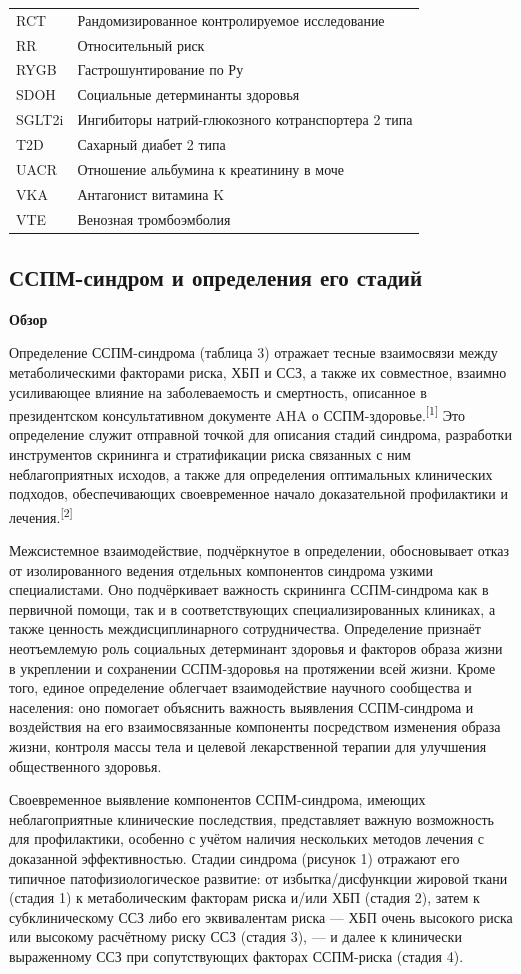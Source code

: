 \documentclass[11pt,a4paper]{article}
\newcommand{\src}[1]{\textsuperscript{[#1]}}
\newcommand{\heading}[1]{\par\medskip\textbf{#1}\par}
\begin{document}
{\begin{longtable}{P{0.18\textwidth}P{0.75\textwidth}}
RCT & Рандомизированное контролируемое исследование\\
RR & Относительный риск\\
RYGB & Гастрошунтирование по Ру\\
SDOH & Социальные детерминанты здоровья\\
SGLT2i & Ингибиторы натрий-глюкозного котранспортера 2 типа\\
T2D & Сахарный диабет 2 типа\\
UACR & Отношение альбумина к креатинину в моче\\
VKA & Антагонист витамина K\\
VTE & Венозная тромбоэмболия\\
\bottomrule
\end{longtable}
}

\subsection{ССПМ-синдром и определения его стадий}
\heading{Обзор}
Определение ССПМ-синдрома (таблица 3) отражает тесные взаимосвязи между метаболическими факторами риска, ХБП и ССЗ, а также их совместное, взаимно усиливающее влияние на заболеваемость и смертность, описанное в президентском консультативном документе AHA о ССПМ-здоровье.\src{1} Это определение служит отправной точкой для описания стадий синдрома, разработки инструментов скрининга и стратификации риска связанных с ним неблагоприятных исходов, а также для определения оптимальных клинических подходов, обеспечивающих своевременное начало доказательной профилактики и лечения.\src{2}

Межсистемное взаимодействие, подчёркнутое в определении, обосновывает отказ от изолированного ведения отдельных компонентов синдрома узкими специалистами. Оно подчёркивает важность скрининга ССПМ-синдрома как в первичной помощи, так и в соответствующих специализированных клиниках, а также ценность междисциплинарного сотрудничества. Определение признаёт неотъемлемую роль социальных детерминант здоровья и факторов образа жизни в укреплении и сохранении ССПМ-здоровья на протяжении всей жизни. Кроме того, единое определение облегчает взаимодействие научного сообщества и населения: оно помогает объяснить важность выявления ССПМ-синдрома и воздействия на его взаимосвязанные компоненты посредством изменения образа жизни, контроля массы тела и целевой лекарственной терапии для улучшения общественного здоровья.

Своевременное выявление компонентов ССПМ-синдрома, имеющих неблагоприятные клинические последствия, представляет важную возможность для профилактики, особенно с учётом наличия нескольких методов лечения с доказанной эффективностью. Стадии синдрома (рисунок 1) отражают его типичное патофизиологическое развитие: от избытка/дисфункции жировой ткани (стадия 1) к метаболическим факторам риска и/или ХБП (стадия 2), затем к субклиническому ССЗ либо его эквивалентам риска --- ХБП очень высокого риска или высокому расчётному риску ССЗ (стадия 3), --- и далее к клинически выраженному ССЗ при сопутствующих факторах ССПМ-риска (стадия 4).
\end{document}
